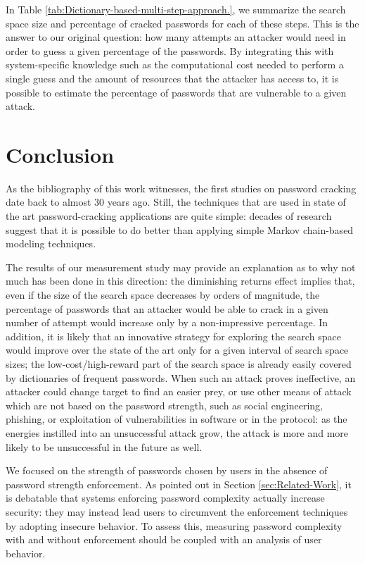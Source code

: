 \documentclass[a4paper,twocolumn]{article}
\begin{document}
In Table \ref{tab:Dictionary-based-multi-step-approach.}, we summarize
the search space size and percentage of cracked passwords for each
of these steps. This is the answer to our original question: how many
attempts an attacker would need in order to guess a given percentage
of the passwords. By integrating this with system-specific knowledge
such as the computational cost needed to perform a single guess and
the amount of resources that the attacker has access to, it is possible
to estimate the percentage of passwords that are vulnerable to a given
attack.


\section{Conclusion}

As the bibliography of this work witnesses, the first studies on password
cracking date back to almost 30 years ago. Still, the techniques that
are used in state of the art password-cracking applications are quite
simple: decades of research suggest that it is possible to do better
than applying simple Markov chain-based modeling techniques.

The results of our measurement study may provide an explanation as
to why not much has been done in this direction: the diminishing returns
effect implies that, even if the size of the search space decreases
by orders of magnitude, the percentage of passwords that an attacker
would be able to crack in a given number of attempt would increase
only by a non-impressive percentage. In addition, it is likely that
an innovative strategy for exploring the search space would improve
over the state of the art only for a given interval of search space
sizes; the low-cost/high-reward part of the search space is already
easily covered by dictionaries of frequent passwords. When such an
attack proves ineffective, an attacker could change target to find
an easier prey, or use other means of attack which are not based on
the password strength, such as social engineering, phishing, or exploitation
of vulnerabilities in software or in the protocol: as the energies
instilled into an unsuccessful attack grow, the attack is more and
more likely to be unsuccessful in the future as well.

We focused on the strength of passwords chosen by users in the absence
of password strength enforcement. As pointed out in Section \ref{sec:Related-Work},
it is debatable that systems enforcing password complexity actually
increase security: they may instead lead users to circumvent the enforcement
techniques by adopting insecure behavior. To assess this, measuring
password complexity with and without enforcement should be coupled
with an analysis of user behavior.
\end{document}
